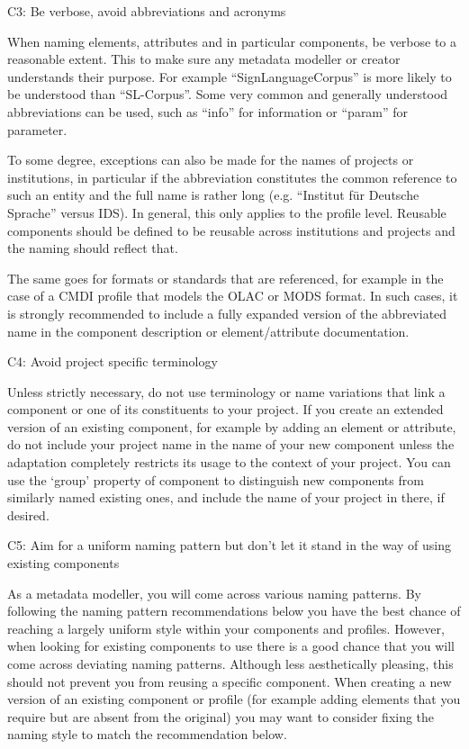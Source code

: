 C3: Be verbose, avoid abbreviations and acronyms


When naming elements, attributes and in particular components, be verbose to a reasonable extent. This to make sure any metadata modeller or creator understands their purpose. For example ``SignLanguageCorpus'' is more likely to be understood than ``SL-Corpus''. Some very common and generally understood abbreviations can be used, such as ``info'' for information or ``param'' for parameter.

To some degree, exceptions can also be made for the names of projects or institutions, in particular if the abbreviation constitutes the common reference to such an entity and the full name is rather long (e.g. ``Institut für Deutsche Sprache'' versus IDS). In general, this only applies to the profile level. Reusable components should be defined to
be reusable across institutions and projects and the naming should reflect that.

The same goes for formats or standards that are referenced, for example in the case of a CMDI profile that models the OLAC or MODS format. In such cases, it is strongly recommended to include a fully expanded version of the abbreviated name in the component description or element/attribute documentation.

C4: Avoid project specific terminology


Unless strictly necessary, do not use terminology or name variations that link a component or one of its constituents to your project. If you create an extended version of an existing component, for example by adding an element or attribute, do not include your project name in the name of your new component unless the adaptation completely restricts its usage to the context of your project. You can use the `group'
property of component to distinguish new components from similarly named existing ones, and include the name of your project in there, if desired.

C5: Aim for a uniform naming pattern but don't let it stand in the way of using existing components

 

As a metadata modeller, you will come across various naming patterns. By following the naming pattern recommendations below you have the best chance of reaching a largely uniform style within your components and profiles. However, when looking for existing components to use there is a good chance that you will come across deviating naming patterns. Although less aesthetically pleasing, this should not prevent you from
reusing a specific component. When creating a new version of an existing component or profile (for example adding elements that you require but are absent from the original) you may want to consider fixing the naming style to match the recommendation below.

